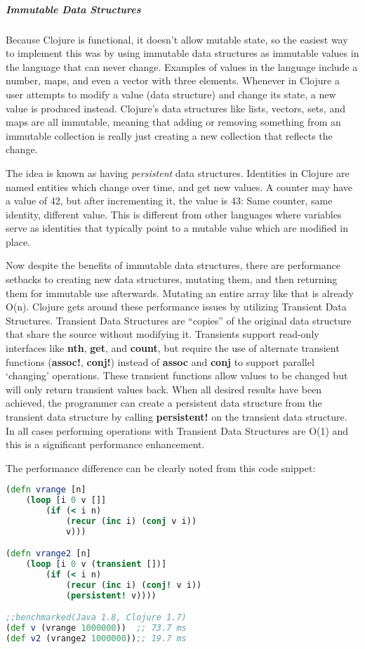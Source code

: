     \subparagraph{Immutable Data Structures}
    
    Because Clojure is functional, it doesn't allow mutable state, so the easiest way to implement this was by using immutable data structures as immutable values in the language that can never change. Examples of values in the language include a number, maps, and even a vector with three elements. Whenever in Clojure a user attempts to modify a value (data structure) and change its state, a new value is produced instead. Clojure's data structures like lists, vectors, sets, and maps are all immutable, meaning that adding or removing something from an immutable collection is really just creating a new collection that reflects the change.  
    
    The idea is known as having \textit{persistent} data structures. Identities in Clojure are named entities which change over time, and get new values. A counter may have a value of 42, but after incrementing it, the value is 43: Same counter, same identity, different value. This is different from other languages where variables serve as identities that typically point to a mutable value which are modified in place. \cite{clojure_website:reference}
    
    Now despite the benefits of immutable data structures, there are performance setbacks to creating new data structures, mutating them, and then returning them for immutable use afterwards. Mutating an entire array like that is already O(n). Clojure gets around these performance issues by utilizing Transient Data Structures. Transient Data Structures are ``copies'' of the original data structure that share the source without modifying it. Transients support read-only interfaces like \textbf{nth}, \textbf{get}, and \textbf{count}, but require the use of alternate transient functions (\textbf{assoc!}, \textbf{conj!}) instead of \textbf{assoc} and \textbf{conj} to support parallel `changing' operations. These transient functions allow values to be changed but will only return transient values back. When all desired results have been achieved, the programmer can create a persistent data structure from the transient data structure by calling \textbf{persistent!} on the transient data structure. In all cases performing operations with Transient Data Structures are O(1) and this is a significant performance enhancement.
    
    The performance difference can be clearly noted from this code snippet:
    
    \begin{lstlisting}[language=clojure]
(defn vrange [n]
	(loop [i 0 v []]
		(if (< i n)
			(recur (inc i) (conj v i))
			v)))

(defn vrange2 [n]
	(loop [i 0 v (transient [])]
		(if (< i n)
			(recur (inc i) (conj! v i))
			(persistent! v))))

;;benchmarked(Java 1.8, Clojure 1.7)
(def v (vrange 1000000))  ;; 73.7 ms
(def v2 (vrange2 1000000));; 19.7 ms
	\end{lstlisting}
    
